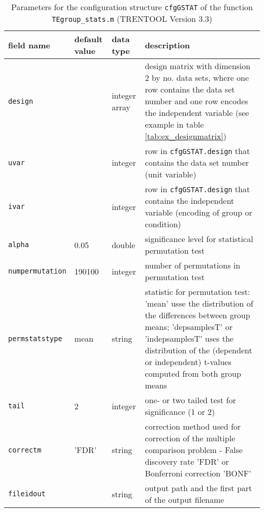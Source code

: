 \begin{table}[H]
\small \centering
\caption[Parameters \texttt{cfgGSTAT}]{Parameters for the configuration structure \texttt{cfgGSTAT} of the function \texttt{TEgroup\_stats.m} (TRENTOOL Version 3.3)} 
\begin{tabularx}{\textwidth}{p{2cm}p{1.5cm}p{1.1cm}X} \toprule
\textbf{field name} & \textbf{default value} & \textbf{data type} & \textbf{description} \\ \midrule
\verb+design+ & & integer array & design matrix with dimension 2 by no. data sets, where one row contains the data set number and one row encodes the independent variable (see example in table \ref{tab:ex_designmatrix})\\
\rowcolor{Gray}
\verb+uvar+ & & integer & row in \verb+cfgGSTAT.design+ that contains the data set number (unit variable)\\
\verb+ivar+ & & integer & row in \verb+cfgGSTAT.design+ that contains the independent variable (encoding of group or condition)\\
\rowcolor{Gray}
\verb+alpha+ &  0.05 & double & significance level for statistical permutation test \\
\verb+numpermutation+ & 190100 & integer &  number of permutations in permutation test \\
\rowcolor{Gray}
\verb+permstatstype+ & mean & string &  statistic for permutation test: 'mean' usse the distribution of the differences between group means; 'depsamplesT' or 'indepsamplesT' uses the distribution of the (dependent or independent) t-values computed from both group means\\
\verb+tail+ & 2 & integer &  one- or two tailed test for significance (1 or 2) \\
\rowcolor{Gray}
\verb+correctm+ & 'FDR' & string &  correction method used for correction of the multiple comparison problem - False discovery rate 'FDR' or Bonferroni correction 'BONF'\\
\verb+fileidout+ & & string &  output path and the first part of the output filename\\ \bottomrule
\end{tabularx} \label{tab:cfgGSTAT}
\end{table}